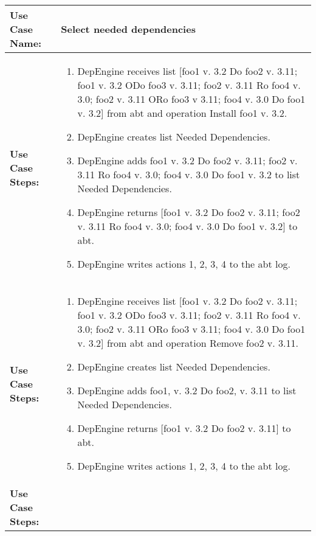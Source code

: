 
\begin{tabularx}{\linewidth}{|l|X|}
\hline
\textbf{Use Case Name:} & \textbf{Select needed dependencies} \\
\hline
\textbf{Use Case Steps:} & 
\begin{minipage}{\linewidth} 
  \vspace{0.05em}
  \begin{enumerate}
  \item DepEngine receives list [foo1 v. 3.2 Do foo2 v. 3.11; foo1 v. 3.2 ODo foo3 v. 3.11; foo2 v. 3.11 Ro foo4 v. 3.0; foo2 v. 3.11 ORo foo3 v 3.11; foo4 v. 3.0 Do foo1 v. 3.2] from abt and operation Install foo1 v. 3.2.
  \item DepEngine creates list Needed Dependencies.
  \item DepEngine adds foo1 v. 3.2 Do foo2 v. 3.11; foo2 v. 3.11 Ro foo4 v. 3.0; foo4 v. 3.0 Do foo1 v. 3.2 to list Needed Dependencies.
  \item DepEngine returns [foo1 v. 3.2 Do foo2 v. 3.11; foo2 v. 3.11 Ro foo4 v. 3.0; foo4 v. 3.0 Do foo1 v. 3.2] to abt.
  \item DepEngine writes actions 1, 2, 3, 4 to the abt log.
    \end{enumerate}
  \vspace{0.05em}
\end{minipage}
\\
\hline 
\textbf{Use Case Steps:} & 
\begin{minipage}{\linewidth} 
  \vspace{0.05em}
  \begin{enumerate}
  \item DepEngine receives list [foo1 v. 3.2 Do foo2 v. 3.11; foo1 v. 3.2 ODo foo3 v. 3.11; foo2 v. 3.11 Ro foo4 v. 3.0; foo2 v. 3.11 ORo foo3 v 3.11; foo4 v. 3.0 Do foo1 v. 3.2] from abt and operation Remove foo2 v. 3.11.
  \item DepEngine creates list Needed Dependencies.
  \item DepEngine adds foo1, v. 3.2 Do foo2, v. 3.11 to list Needed Dependencies.
  \item DepEngine returns [foo1 v. 3.2 Do foo2 v. 3.11] to abt.
  \item DepEngine writes actions 1, 2, 3, 4 to the abt log.
    \end{enumerate}
  \vspace{0.05em}
\end{minipage}
\\
\hline 
\textbf{Use Case Steps:} & 
\begin{minipage}{\linewidth} 

\end{minipage}
\end{tabularx}
